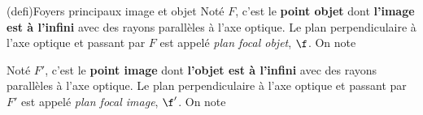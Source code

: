 \documentclass[../../main/main.tex]{subfiles}
\begin{document}
\begin{tcb}[label=def:foy, sidebyside, sidebyside align=top](defi){Foyers
			principaux image et objet}
	Noté $F$, c'est le \textbf{point objet} dont \textbf{l'image est à l'infini}
	avec des rayons parallèles à l'axe optique.
	\smallbreak
	Le plan perpendiculaire à l'axe optique et passant par $F$ est appelé
	\textit{plan focal objet}, $\f$. On note
	\smallbreak
	\begin{center}
	\end{center}
	\tcblower
	Noté $F'$, c'est le \textbf{point image} dont \textbf{l'objet est à l'infini}
	avec des rayons parallèles à l'axe optique.
	\smallbreak
	Le plan perpendiculaire à l'axe optique
	et passant par $F'$ est appelé \textit{plan focal image}, $\f'$. On note
	\smallbreak
	\begin{center}
	\end{center}
\end{tcb}
\end{document}
